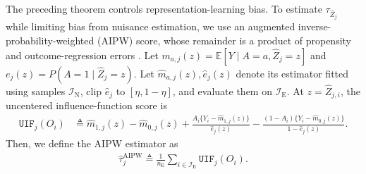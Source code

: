 The preceding theorem controls representation-learning bias. To estimate $\tau_{\widehat Z_j}$ while limiting bias from nuisance estimation, we use an augmented inverse-probability-weighted (AIPW) score, whose remainder is a product of propensity and outcome-regression errors \citep{robins1994estimation,tsiatis2006semiparametric,chernozhukov2017double,kennedy2022semiparametric}. Let $m_{a,j}(z)=\mathbb E[Y\mid A=a,\widehat Z_j=z]$ and $e_j(z)=P(A=1\mid\widehat Z_j=z)$. Let $\widehat{m}_{a,j}(z), \widehat{e}_j(z)$ denote its estimator fitted using samples $\mathcal I_{\mathrm N}$, clip $\widehat e_j$ to $[\eta,1-\eta]$, and evaluate them on $\mathcal I_{\mathrm E}$. At $z=\widehat Z_{j,i}$, the uncentered influence-function score \citep{robins1994estimation,tsiatis2006semiparametric} is
\begin{align}\label{eq:honest-aipw-score}
	\mathtt{UIF}_j(O_i) &\triangleq \widehat m_{1,j}(z)-\widehat m_{0,j}(z)+\frac{A_i\{Y_i-\widehat m_{1,j}(z)\}}{\widehat e_j(z)}-\frac{(1-A_i)\{Y_i-\widehat m_{0,j}(z)\}}{1-\widehat e_j(z)}.
\end{align}
Then, we define the AIPW estimator as 
\begin{align}\label{eq:aipw-estimator}
	\widehat\tau_j^{\mathrm{AIPW}} \triangleq \frac{1}{n_{\mathrm E}}\sum_{i\in\mathcal I_{\mathrm E}}\mathtt{UIF}_j(O_i).
\end{align}


